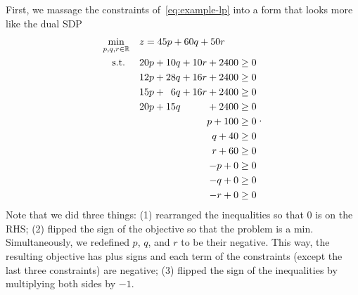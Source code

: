 \documentclass[a4paper]{article}
\begin{document}
First, we massage the constraints of~\eqref{eq:example-lp} into a form that looks more like the dual SDP
\begin{equation}
\begin{split}
\min_{p,q,r\in\mathbb{R}}  \quad & z = 45p + 60q + 50r \\
\textrm{s.t. } \quad &
  \begin{aligned}[t]
    20p + 10q + 10r + 2400 &\ge 0\\
    12p + 28q + 16r + 2400 &\ge 0\\
    15p + \hphantom{0}6q  + 16r + 2400 &\ge 0\\
    20p + 15q \hphantom{{}+{}00r} + 2400 &\ge 0\\
    p + 100 &\ge 0 \\
    q + 40 &\ge 0 \\
    r + 60 &\ge 0 \\
    -p + 0 &\ge 0 \\
    -q + 0 &\ge 0 \\
    -r + 0 &\ge 0 \\
  \end{aligned}
\end{split}\;.
\end{equation}
Note that we did three things: (1) rearranged the inequalities so that $0$ is on the RHS; (2) flipped the sign of the objective so that the problem is a min. Simultaneously, we redefined $p$, $q$, and $r$ to be their negative. This way, the resulting objective has plus signs and each term of the constraints (except the last three constraints) are negative; (3) flipped the sign of the inequalities by multiplying both sides by $-1$.
\end{document}
